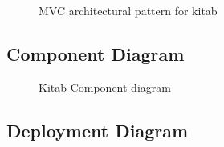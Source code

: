 		\begin{figure}[H]
		\begin{center}

		\caption{MVC architectural pattern for kitab}
		\label{dia_mvc_arch_pattern}

		\end{center}
		\end{figure}

	\subsection{Component Diagram}

		\begin{figure}[H]
		\begin{center}

		\caption{Kitab Component diagram}
		\label{dia_mvc_cmpnt}

		\end{center}
		\end{figure}

	\subsection{Deployment Diagram}

